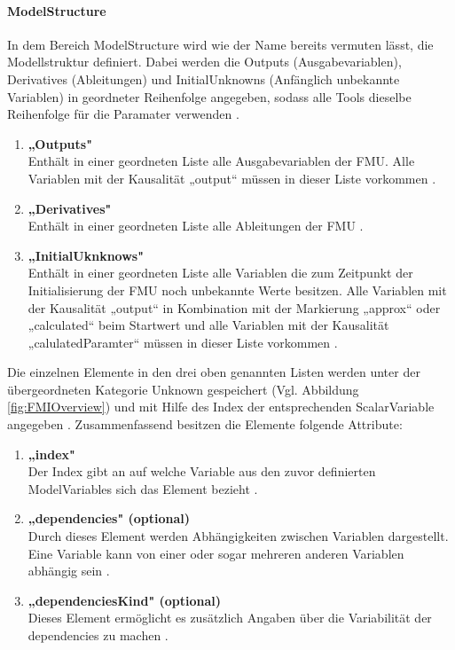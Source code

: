 \paragraph{ModelStructure}\label{sec:ModelStructure}
\noindent In dem Bereich ModelStructure wird wie der Name bereits vermuten lässt, die Modellstruktur definiert. Dabei werden die Outputs (Ausgabevariablen), Derivatives (Ableitungen) und InitialUnknowns (Anfänglich unbekannte Variablen) in geordneter Reihenfolge angegeben, sodass alle Tools dieselbe Reihenfolge für die Paramater verwenden \cite[S.57]{25}.
\begin{enumerate}
	\item \textbf{„Outputs"} \cite[S.60]{25} \\
	Enthält in einer geordneten Liste alle Ausgabevariablen der FMU. Alle Variablen mit der 
	Kausalität „output“ müssen in dieser Liste vorkommen \cite[S.60]{25}.
	\item \textbf{„Derivatives"} \cite[S.60f]{25} \\
	Enthält in einer geordneten Liste alle Ableitungen der FMU \cite[S.60f]{25}.
	\item \textbf{„InitialUknknows"} \cite[S.61]{25} \\
	Enthält in einer geordneten Liste alle Variablen die zum Zeitpunkt der Initialisierung der FMU	noch unbekannte Werte besitzen. Alle Variablen mit der Kausalität „output“ in Kombination mit der Markierung „approx“ oder „calculated“ beim Startwert  und alle Variablen mit der Kausalität „calulatedParamter“ müssen in dieser Liste vorkommen \cite[S.61]{25}.
\end{enumerate}
Die einzelnen Elemente in den drei oben genannten Listen werden unter der übergeordneten Kategorie Unknown gespeichert (Vgl. Abbildung \ref{fig:FMIOverview}) und mit Hilfe des Index der entsprechenden ScalarVariable angegeben \cite[S.61]{25}. Zusammenfassend besitzen die Elemente folgende Attribute:
\begin{enumerate}
	\item \textbf{„index"} \cite[S.62]{25} \\
	Der Index gibt an auf welche Variable aus den zuvor definierten ModelVariables sich das 
	Element bezieht \cite[S.62]{25}.
	\item \textbf{„dependencies" (optional)} \cite[S.62]{25} \\
	Durch dieses Element werden Abhängigkeiten zwischen Variablen dargestellt. Eine Variable
	kann von einer oder sogar mehreren anderen Variablen abhängig sein \cite[S.62]{25}.
	\item \textbf{„dependenciesKind" (optional)} \cite[S.63]{25} \\
	Dieses Element ermöglicht es zusätzlich Angaben über die Variabilität der dependencies zu 
	machen \cite[S.63]{25}.
\end{enumerate}
